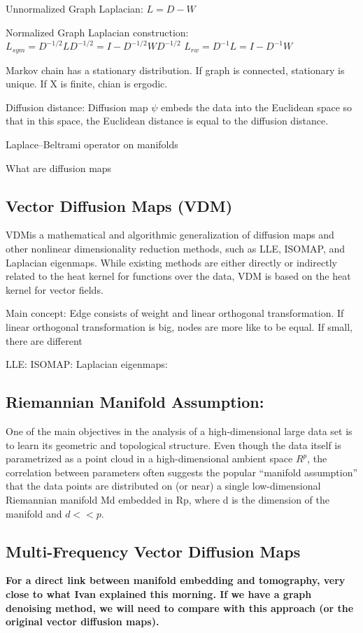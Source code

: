 Unnormalized Graph Laplacian:
$L = D - W$

Normalized Graph Laplacian construction:
$L_{sym} = D^{-1/2}LD^{-1/2} = I - D^{-1/2}WD^{-1/2} $
$L_{rw} = D^{-1}L = I - D^{-1}W $

Markov chain has a stationary distribution.
If graph is connected, stationary is unique.
If X is finite, chian is ergodic.

Diffusion distance:
Diffusion map $\psi$ embeds the data into the Euclidean space so that in this space, the Euclidean
distance is equal to the diffusion distance.

Laplace–Beltrami operator on manifolds

What are diffusion maps

\subsection{Vector Diffusion Maps (VDM)}

\cite{vectorDiffusionMaps}
VDMis a mathematical and algorithmic generalization of diffusion maps
and other nonlinear dimensionality reduction methods, such as LLE, ISOMAP,
and Laplacian eigenmaps. While existing methods are either directly or indirectly
related to the heat kernel for functions over the data, VDM is based on
the heat kernel for vector fields.

Main concept:
Edge consists of weight and linear orthogonal transformation.
If linear orthogonal transformation is big, nodes are more like to be equal.
If small, there are different

LLE:
ISOMAP:
Laplacian eigenmaps:


\subsection{Riemannian Manifold Assumption:}
One of the main objectives in the analysis of a high-dimensional large data set
is to learn its geometric and topological structure. Even though the data itself is
parametrized as a point cloud in a high-dimensional ambient space $R^p$, the correlation
between parameters often suggests the popular “manifold assumption” that
the data points are distributed on (or near) a single low-dimensional Riemannian
manifold Md embedded in Rp, where d is the dimension of the manifold and
$d << p$.


\subsection{Multi-Frequency Vector Diffusion Maps}
\textbf{For a direct link between manifold embedding and tomography, very close to what Ivan explained this morning.
If we have a graph denoising method, we will need to compare with this approach 
(or the original vector diffusion maps).}


